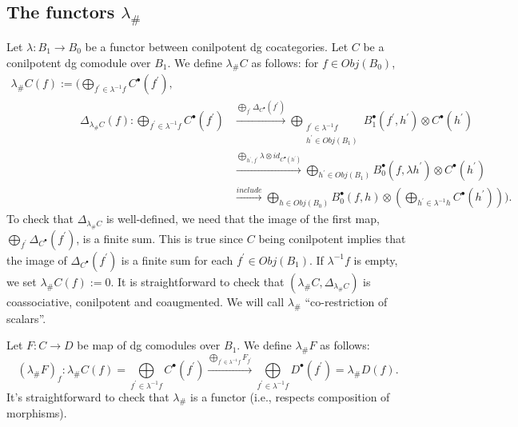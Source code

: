 \subsection{The functors $\lambda_\#$}
\label{sec:pf_defn}
Let $\lambda:B_1 \to B_0$ be a functor 
between conilpotent dg 
cocategories. Let $C$ be a 
conilpotent dg comodule over $B_1$.
We define $\lambda_\# C$ as follows: 
for $f \in Obj(B_0)$,
\begin{align*}
\lambda_\# C(f) := 
\big( \bigoplus \limits_{f^\prime \in \lambda^{-1}f}
C^\bullet(f^\prime),\\
\phantom{{}\lambda_\# C(f):=\big({}}
\Delta_{\lambda_\#C}(f):
\bigoplus \limits_{f^\prime \in \lambda^{-1}f}
C^\bullet(f^\prime)
&
\xrightarrow{\bigoplus \limits_{f^\prime} 
  \Delta_{C^\bullet}(f^\prime)}
\bigoplus \limits_{
  \substack{f^\prime \in \lambda^{-1}f\\h^\prime \in Obj(B_1)}}
 B_1^\bullet(f^\prime,h^\prime) \otimes C^\bullet(h^\prime) \\
&
\xrightarrow{\bigoplus \limits_{h^\prime,f^\prime} \lambda 
\otimes id_{C^\bullet(h^\prime)}}
\bigoplus \limits_{h^\prime \in Obj(B_1)}
  B_0^\bullet(f,\lambda h^\prime)
  \otimes C^\bullet(h^\prime) \\
&
\xrightarrow{include}
\bigoplus \limits_{h \in Obj(B_0)}
  B_0^\bullet(f,h) \otimes 
  (\bigoplus \limits_{h^\prime \in \lambda^{-1}h}
  C^\bullet(h^\prime))   
\big).
\end{align*}
To check that $\Delta_{\lambda_\#C}$ is well-defined, 
we need that the image of the first map, 
$\bigoplus \limits_{f^\prime} 
  \Delta_{C^\bullet}(f^\prime)$, 
is a finite sum. This is true since 
$C$ being conilpotent implies that 
the image of $\Delta_{C^\bullet}(f^\prime)$ 
is a finite sum for each $f^\prime \in
Obj(B_1)$. If $\lambda^{-1}f$ is empty, 
we set $\lambda_\# C(f) := 0$.
It is straightforward to check 
that $(\lambda_\#C, \Delta_{\lambda_\#C})$ 
is coassociative, conilpotent
and coaugmented. 
We will call $\lambda_\#$ 
``co-restriction of scalars''.

Let $F:C \to D$ be map of dg comodules 
over $B_1$. We define $\lambda_\# F$ as follows:
$$
(\lambda_\# F)_f : 
\lambda_\# C (f) = 
\bigoplus \limits_{f^\prime \in \lambda^{-1}f}
C^\bullet(f^\prime)
\xrightarrow{\bigoplus \limits_{f^\prime \in \lambda^{-1}f}
F_{f^\prime}} 
\bigoplus \limits_{f^\prime \in \lambda^{-1}f}
D^\bullet(f^\prime)
= \lambda_\# D (f).
$$
It's straightforward to check that $\lambda_\#$ 
is a functor (i.e., respects composition of 
morphisms).
